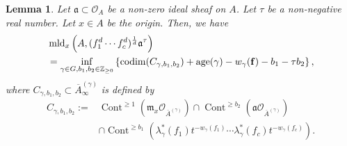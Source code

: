 \documentclass[a4paper,11pt]{amsart}
\newtheorem{lem}[thm]{Lemma}
\theoremstyle{definition}
\theoremstyle{remark}
\begin{document}
\begin{lem}\label{lem:zure}
Let $\mathfrak{a} \subset \mathcal{O}_A$ be a non-zero ideal sheaf on $A$. 
Let $\tau$ be a non-negative real number. 
Let $x \in A$ be the origin. 
Then, we have
\begin{align*}
&\operatorname{mld}_x \left( A, (f_1 ^d \cdots f_c ^d )^{\frac{1}{d}} \mathfrak{a} ^{\tau} \right) \\
&= \inf _{\gamma \in G, b_1, b_2 \in \mathbb{Z}_{\ge 0}}
\left \{ 
\operatorname{codim} (C_{\gamma, b_1, b_2}) + \operatorname{age}(\gamma) - w_{\gamma} ({\bf f}) - b_1 - \tau b_2 
\right \},
\end{align*}
where $C_{\gamma, b_1, b_2} \subset \overline{A}^{(\gamma)} _{\infty}$ is defined by
\begin{align*}
C_{\gamma, b_1, b_2} := {}
&\operatorname{Cont}^{\ge 1} \left(\mathfrak{m}_x \mathcal{O}_{\overline{A}^{(\gamma)}} \right)
\cap
\operatorname{Cont}^{\ge b_2} \left( \mathfrak{a} \mathcal{O}_{\overline{A}^{(\gamma)}} \right) \\
&\cap 
\operatorname{Cont}^{\ge b_1} \left( \lambda ^* _{\gamma}(f_1)t^{-w_\gamma(f_1)}\cdots \lambda ^* _{\gamma}(f_c)t^{-w_\gamma(f_c)} \right). 
\end{align*} 
\end{lem}
\end{document}
